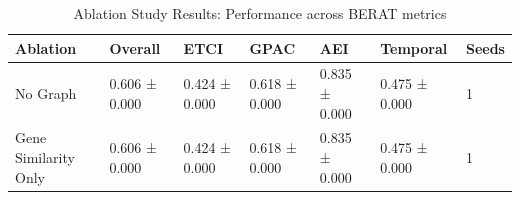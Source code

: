 \begin{table}[htbp]
\centering
\caption{Ablation Study Results: Performance across BERAT metrics}
\label{tab:ablation_results}
\begin{tabular}{lllllll}
\toprule
Ablation & Overall & ETCI & GPAC & AEI & Temporal & Seeds \\
\midrule
No Graph & 0.606 ± 0.000 & 0.424 ± 0.000 & 0.618 ± 0.000 & 0.835 ± 0.000 & 0.475 ± 0.000 & 1 \\
Gene Similarity Only & 0.606 ± 0.000 & 0.424 ± 0.000 & 0.618 ± 0.000 & 0.835 ± 0.000 & 0.475 ± 0.000 & 1 \\
\bottomrule
\end{tabular}
\end{table}
